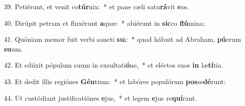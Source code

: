 39. Petiérunt, et venit co\textbf{túr}nix:~*  et pane cæli satu\textbf{rá}vit \textbf{e}os.\

40. Dirúpit petram et fluxérunt \textbf{a}quæ:~*  abiérunt in \textbf{sic}co \textbf{flú}mina;\

41. Quóniam memor fuit verbi sancti \textbf{su}i:~*  quod hábuit ad Abraham, \textbf{pú}erum \textbf{su}um.\

42. Et edúxit pópulum suum in exsultati\textbf{ó}ne,~*  et eléctos suos \textbf{in} læ\textbf{tí}tia.\

43. Et dedit illis regiónes \textbf{Gén}tium:~*  et labóres populórum \textbf{pos}se\textbf{dé}runt:\

44. Ut custódiant justificatiónes \textbf{e}jus,~*  et legem \textbf{e}jus re\textbf{quí}rant.\

